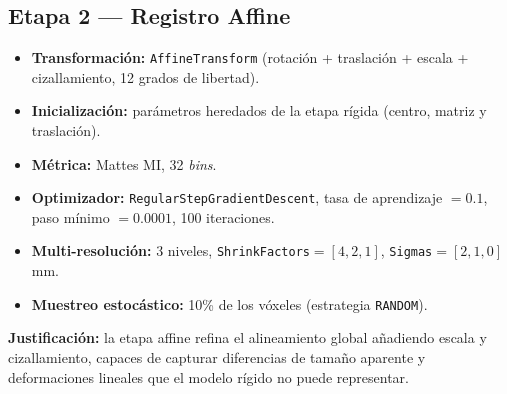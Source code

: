 \documentclass[12pt, letterpaper]{article}
\begin{document}
\subsection{Etapa 2 — Registro Affine}
\begin{itemize}
    \item \textbf{Transformación:} \texttt{AffineTransform} (rotación +
    traslación + escala + cizallamiento, 12 grados de libertad).
    \item \textbf{Inicialización:} parámetros heredados de la etapa rígida
    (centro, matriz y traslación).
    \item \textbf{Métrica:} Mattes MI, 32 \textit{bins}.
    \item \textbf{Optimizador:} \texttt{RegularStepGradientDescent}, tasa de
    aprendizaje $=0.1$, paso mínimo $=0.0001$, 100 iteraciones.
    \item \textbf{Multi-resolución:} 3 niveles, \texttt{ShrinkFactors}$=[4,2,1]$,
    \texttt{Sigmas}$=[2,1,0]$ mm.
    \item \textbf{Muestreo estocástico:} 10\% de los vóxeles (estrategia
    \texttt{RANDOM}).
\end{itemize}
\textbf{Justificación:} la etapa affine refina el alineamiento global añadiendo
escala y cizallamiento, capaces de capturar diferencias de tamaño aparente y
deformaciones lineales que el modelo rígido no puede representar.

\end{document}
